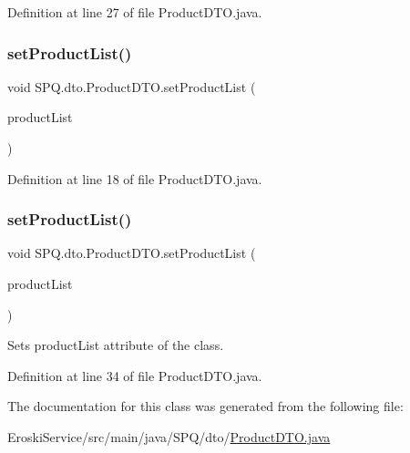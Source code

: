 Definition at line 27 of file Product\+D\+T\+O.\+java.

\mbox{\label{class_s_p_q_1_1dto_1_1_product_d_t_o_a79be4bcc432ec5c17c5873e868aa2e4f}} 
\subsubsection{\texorpdfstring{set\+Product\+List()}{setProductList()}\hspace{0.1cm}{\footnotesize\ttfamily [1/2]}}
{\footnotesize\ttfamily void S\+P\+Q.\+dto.\+Product\+D\+T\+O.\+set\+Product\+List (\begin{DoxyParamCaption}\item[{Array\+List$<$ \mbox{\hyperlink{class_s_p_q_1_1data_1_1_product}{Product}} $>$}]{product\+List }\end{DoxyParamCaption})}



Definition at line 18 of file Product\+D\+T\+O.\+java.

\mbox{\label{class_s_p_q_1_1dto_1_1_product_d_t_o_a79be4bcc432ec5c17c5873e868aa2e4f}} 
\subsubsection{\texorpdfstring{set\+Product\+List()}{setProductList()}\hspace{0.1cm}{\footnotesize\ttfamily [2/2]}}
{\footnotesize\ttfamily void S\+P\+Q.\+dto.\+Product\+D\+T\+O.\+set\+Product\+List (\begin{DoxyParamCaption}\item[{Array\+List$<$ \mbox{\hyperlink{class_s_p_q_1_1data_1_1_product}{Product}} $>$}]{product\+List }\end{DoxyParamCaption})}

Sets product\+List attribute of the class. 

Definition at line 34 of file Product\+D\+T\+O.\+java.



The documentation for this class was generated from the following file\+:\begin{DoxyCompactItemize}
\item 
Eroski\+Service/src/main/java/\+S\+P\+Q/dto/\mbox{\hyperlink{_eroski_service_2src_2main_2java_2_s_p_q_2dto_2_product_d_t_o_8java}{Product\+D\+T\+O.\+java}}\end{DoxyCompactItemize}
